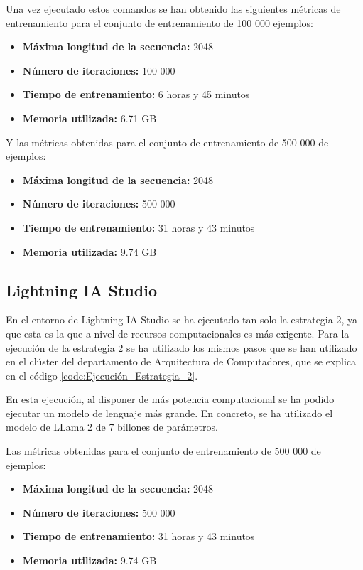 Una vez ejecutado estos comandos se han obtenido las siguientes métricas de entrenamiento
para el conjunto de entrenamiento de 100 000 ejemplos:

\begin{itemize}
    \item \textbf{Máxima longitud de la secuencia:} 2048
    \item \textbf{Número de iteraciones:} 100 000
    \item \textbf{Tiempo de entrenamiento:} 6 horas y 45 minutos
    \item \textbf{Memoria utilizada:} 6.71 GB
\end{itemize}

Y las métricas obtenidas para el conjunto de entrenamiento de 500 000 de ejemplos:

\begin{itemize}
    \item \textbf{Máxima longitud de la secuencia:} 2048
    \item \textbf{Número de iteraciones:} 500 000
    \item \textbf{Tiempo de entrenamiento:} 31 horas y 43 minutos
    \item \textbf{Memoria utilizada:} 9.74 GB
\end{itemize}


\subsection{Lightning IA Studio}
\label{subsec:lightning_ia_studio_ejecucion}


En el entorno de Lightning IA Studio se ha ejecutado tan solo la estrategia 2, ya que
esta es la que a nivel de recursos computacionales es más exigente. Para la ejecución
de la estrategia 2 se ha utilizado los mismos pasos que se han utilizado en el clúster
del departamento de Arquitectura de Computadores, que se explica en el código \ref{code:Ejecución_Estrategia_2}.

En esta ejecución, al disponer de más potencia computacional se ha podido ejecutar un modelo
de lenguaje más grande. En concreto, se ha utilizado el modelo de LLama 2 de 7 billones de
parámetros.

Las métricas obtenidas para el conjunto de entrenamiento de 500 000 de ejemplos:

\begin{itemize}
    \item \textbf{Máxima longitud de la secuencia:} 2048
    \item \textbf{Número de iteraciones:} 500 000
    \item \textbf{Tiempo de entrenamiento:} 31 horas y 43 minutos
    \item \textbf{Memoria utilizada:} 9.74 GB
\end{itemize}



